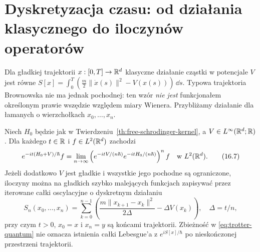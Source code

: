\section{Dyskretyzacja czasu: od działania klasycznego do iloczynów operatorów}

Dla gładkiej trajektorii $x:[0,T]\to\mathbb{R}^d$ klasyczne
działanie cząstki w potencjale $V$ jest równe
$S[x]=\int_0^T(\frac m2\|\dot x(s)\|^2-V(x(s)))\,\dd s$.
Typowa trajektoria Brownowska nie ma jednak pochodnej:
ten wzór \emph{nie jest} funkcjonałem określonym prawie
wszędzie względem miary Wienera. Przybliżamy działanie
dla łamanych o wierzchołkach $x_0,\ldots,x_n$.

\begin{twierdzenie}
\label{th:QM-trotter}
Niech $H_0$ będzie jak w Twierdzeniu~\ref{th:free-schrodinger-kernel},
a $V\in L^\infty(\mathbb{R}^d;\mathbb{R})$. Dla każdego $t\in\mathbb{R}$
i $f\in L^2(\mathbb{R}^d)$ zachodzi
\[
 e^{-it(H_0+V)/\hbar}f
 =\lim_{n\to\infty}
 \left(e^{-itV/(n\hbar)}e^{-itH_0/(n\hbar)}\right)^n f
 \quad\text{w }L^2(\mathbb{R}^d).
\tag{16.7}\label{eq:trotter-quantum}
\]
Jeżeli dodatkowo $V$ jest gładkie i wszystkie jego
pochodne są ograniczone, iloczyny można na gładkich
szybko malejących funkcjach zapisywać przez iterowane
całki oscylacyjne o dyskretnym działaniu
\[
 S_n(x_0,\ldots,x_n)
 =\sum_{k=0}^{n-1}\left(
    \frac{m\|x_{k+1}-x_k\|^2}{2\Delta}
    -\Delta V(x_k)\right),\quad\Delta=t/n,
\tag{16.8}\label{eq:discrete-action}
\]
przy czym $t>0$, $x_0=x$ i $x_n=y$ są końcami
trajektorii. Zbieżność w \eqref{eq:trotter-quantum}
nie oznacza istnienia całki Lebesgue'a z
$e^{iS[x]/\hbar}$ po nieskończonej przestrzeni trajektorii.
\end{twierdzenie}
